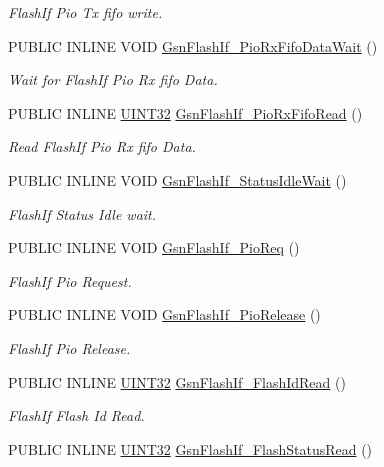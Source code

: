 \begin{DoxyCompactItemize}
\begin{DoxyCompactList}\small\item\em FlashIf Pio Tx fifo write. \end{DoxyCompactList}\item 
PUBLIC INLINE VOID \hyperlink{a00647_ga035c5d3ec64ab8e86cacf6cd39762303}{GsnFlashIf\_\-PioRxFifoDataWait} ()
\begin{DoxyCompactList}\small\item\em Wait for FlashIf Pio Rx fifo Data. \end{DoxyCompactList}\item 
PUBLIC INLINE \hyperlink{a00660_gae1e6edbbc26d6fbc71a90190d0266018}{UINT32} \hyperlink{a00647_ga3c41c43e8ea5c81f7c5307820685fdaf}{GsnFlashIf\_\-PioRxFifoRead} ()
\begin{DoxyCompactList}\small\item\em Read FlashIf Pio Rx fifo Data. \end{DoxyCompactList}\item 
PUBLIC INLINE VOID \hyperlink{a00647_ga2e7a4bf76eb4e6da69d976bd9337a863}{GsnFlashIf\_\-StatusIdleWait} ()
\begin{DoxyCompactList}\small\item\em FlashIf Status Idle wait. \end{DoxyCompactList}\item 
PUBLIC INLINE VOID \hyperlink{a00647_ga5acfd4e90824451ba8ac4ec7f2aef58e}{GsnFlashIf\_\-PioReq} ()
\begin{DoxyCompactList}\small\item\em FlashIf Pio Request. \end{DoxyCompactList}\item 
PUBLIC INLINE VOID \hyperlink{a00647_gafdff247602c68652a230d5335f34f519}{GsnFlashIf\_\-PioRelease} ()
\begin{DoxyCompactList}\small\item\em FlashIf Pio Release. \end{DoxyCompactList}\item 
PUBLIC INLINE \hyperlink{a00660_gae1e6edbbc26d6fbc71a90190d0266018}{UINT32} \hyperlink{a00647_ga9bd33077456561b3a74960e3b59fd3a1}{GsnFlashIf\_\-FlashIdRead} ()
\begin{DoxyCompactList}\small\item\em FlashIf Flash Id Read. \end{DoxyCompactList}\item 
PUBLIC INLINE \hyperlink{a00660_gae1e6edbbc26d6fbc71a90190d0266018}{UINT32} \hyperlink{a00647_ga48297488ec4d500970cb6950cae78570}{GsnFlashIf\_\-FlashStatusRead} ()

\end{DoxyCompactItemize}
